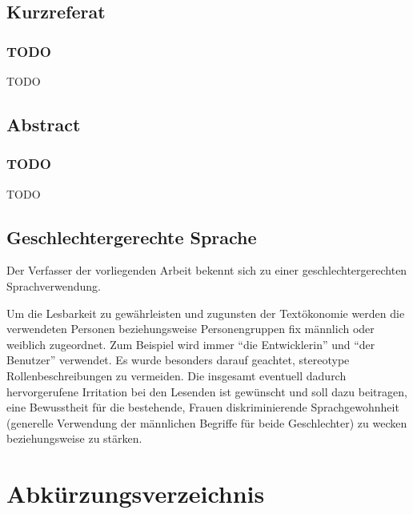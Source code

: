 \documentclass[a4paper,12pt,twoside]{scrreprt}
\begin{document}
\newpage
\section*{Kurzreferat}
\label{sec:kurzreferat}

\subsection*{TODO}

TODO

\newpage
\section*{Abstract}
\label{sec:abstract}

\subsection*{TODO}

TODO

\newpage
\section*{Geschlechtergerechte Sprache}
\label{sec:gendern}

Der Verfasser der vorliegenden Arbeit bekennt sich zu einer geschlechtergerechten Sprachverwendung.

Um die Lesbarkeit zu gewährleisten und zugunsten der Textökonomie werden die verwendeten Personen beziehungsweise Personengruppen fix männlich oder weiblich zugeordnet. Zum Beispiel wird immer \enquote{die Entwicklerin} und \enquote{der Benutzer} verwendet. Es wurde besonders darauf geachtet, stereotype Rollenbeschreibungen zu vermeiden. Die insgesamt eventuell dadurch hervorgerufene Irritation bei den Lesenden ist gewünscht und soll dazu beitragen, eine Bewusstheit für die bestehende, Frauen diskriminierende Sprachgewohnheit (generelle Verwendung der männlichen Begriffe für beide Geschlechter) zu wecken beziehungsweise zu stärken.

\cleardoublepage %
\setcounter{tocdepth}{2}
\tableofcontents

\clearpage
{}
{}
\listoffigures

\clearpage
{}
{}
\chapter*{Abkürzungsverzeichnis}
\begin{acronym}
\end{acronym}
\end{document}
